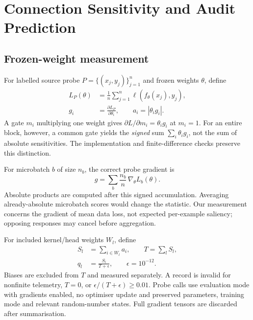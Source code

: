 \documentclass[nolineno]{ieeeaccess}
\begin{document}
\section{Connection Sensitivity and Audit Prediction}
\label{sec:method}
\subsection{Frozen-weight measurement}
For labelled source probe $P=\{(x_j,y_j)\}_{j=1}^{n}$ and frozen weights $\theta$, define
\begin{equation}
\begin{aligned}
L_P(\theta)&=\frac1n\sum_{j=1}^{n}\ell(f_\theta(x_j),y_j),\\
g_i&=\frac{\partial L_P}{\partial\theta_i},\qquad a_i=|\theta_i g_i|.
\end{aligned}
\label{eq:sensitivity}
\end{equation}
A gate $m_i$ multiplying one weight gives $\partial L/\partial m_i=\theta_i g_i$ at $m_i=1$. For an entire block, however, a common gate yields the \emph{signed} sum $\sum_i\theta_i g_i$, not the sum of absolute sensitivities. The implementation and finite-difference checks preserve this distinction.

For microbatch $b$ of size $n_b$, the correct probe gradient is
\begin{equation}
g=\sum_b\frac{n_b}{n}\,\nabla_\theta L_b(\theta).
\label{eq:microbatch}
\end{equation}
Absolute products are computed after this signed accumulation. Averaging already-absolute microbatch scores would change the statistic. Our measurement concerns the gradient of mean data loss, not expected per-example saliency; opposing responses may cancel before aggregation.

For included kernel/head weights $W_l$, define
\begin{equation}
\begin{aligned}
S_l&=\sum_{i\in W_l}a_i,\qquad T=\sum_lS_l,\\
q_l&=\frac{S_l}{T+\epsilon},\qquad\epsilon=10^{-12}.
\end{aligned}
\label{eq:shares}
\end{equation}
Biases are excluded from $T$ and measured separately. A record is invalid for nonfinite telemetry, $T=0$, or $\epsilon/(T+\epsilon)\geq0.01$. Probe calls use evaluation mode with gradients enabled, no optimiser update and preserved parameters, training mode and relevant random-number states. Full gradient tensors are discarded after summarisation.
\end{document}
